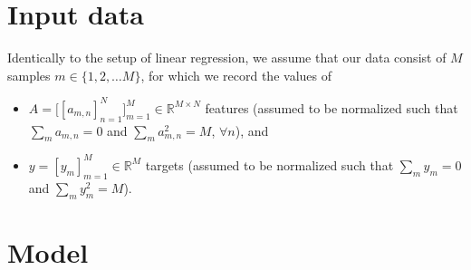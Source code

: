 \documentclass[letter,10pt,oneside]{article}
\newcommand{\+}{^\dagger}
\begin{document}
\newpage
\tableofcontents

\newpage

\section{Input data}

Identically to the setup of linear regression, we assume that our data consist of $M$ samples $m\in \{1,2, \ldots M\}$, for which we record the values of 
\begin{itemize}
  \item $A = \big[[a_{m,n}]_{n=1}^N\big]_{m=1}^M \in \mathds{R}^{M\times N}$ features (assumed to be normalized such that $\sum_m a_{m,n} = 0$ and $\sum_m a_{m,n}^2 = M$, $\forall n$), and
  \item $y = [y_m]_{m=1}^M \in \mathds{R}^{M}$ targets (assumed to be normalized such that $\sum_m y_m = 0$ and $\sum_m y_m^2 = M$).
\end{itemize}

\section{Model}
\end{document}

